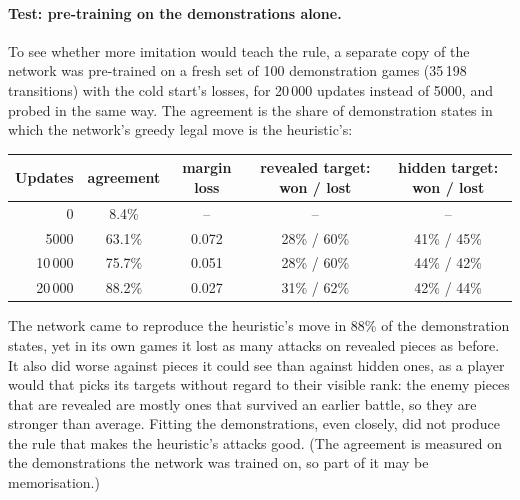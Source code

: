 \paragraph{Test: pre-training on the demonstrations alone.} To see whether more imitation would
teach the rule, a separate copy of the network was pre-trained on a fresh set of 100
demonstration games (35\,198 transitions) with the cold start's losses, for 20\,000 updates
instead of 5000, and probed in the same way. The agreement is the share of demonstration states
in which the network's greedy legal move is the heuristic's:
\begin{center}
\begin{tabular}{rcccc}
\toprule
Updates & agreement & margin loss & revealed target: won / lost & hidden target: won / lost \\
\midrule
0      & 8.4\%  & --    & --          & --          \\
5000   & 63.1\% & 0.072 & 28\% / 60\% & 41\% / 45\% \\
10\,000 & 75.7\% & 0.051 & 28\% / 60\% & 44\% / 42\% \\
20\,000 & 88.2\% & 0.027 & 31\% / 62\% & 42\% / 44\% \\
\bottomrule
\end{tabular}
\end{center}
The network came to reproduce the heuristic's move in 88\% of the demonstration states, yet in its
own games it lost as many attacks on revealed pieces as before. It also did worse against pieces
it could see than against hidden ones, as a player would that picks its targets without regard to
their visible rank: the enemy pieces that are revealed are mostly ones that survived an earlier
battle, so they are stronger than average. Fitting the demonstrations, even closely, did not
produce the rule that makes the heuristic's attacks good. (The agreement is measured on the
demonstrations the network was trained on, so part of it may be memorisation.)

